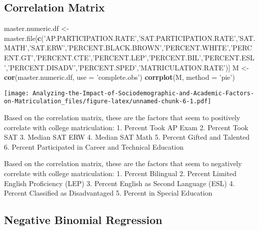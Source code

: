 \documentclass[
]{article}
\newenvironment{Shaded}{\begin{snugshade}}{\end{snugshade}}
\newcommand{\DataTypeTok}[1]{\textcolor[rgb]{0.13,0.29,0.53}{#1}}
\newcommand{\KeywordTok}[1]{\textcolor[rgb]{0.13,0.29,0.53}{\textbf{#1}}}
\newcommand{\NormalTok}[1]{#1}
\newcommand{\StringTok}[1]{\textcolor[rgb]{0.31,0.60,0.02}{#1}}
\begin{document}
\hypertarget{correlation-matrix}{%
\subsection{Correlation Matrix}\label{correlation-matrix}}

\begin{Shaded}
\begin{Highlighting}[]
\NormalTok{master.numeric.df <-}\StringTok{ }\NormalTok{master.file[}\KeywordTok{c}\NormalTok{(}\StringTok{'AP.PARTICIPATION.RATE'}\NormalTok{,}\StringTok{'SAT.PARTICIPATION.RATE'}\NormalTok{,}\StringTok{'SAT.MATH'}\NormalTok{,}\StringTok{'SAT.ERW'}\NormalTok{,}\StringTok{'PERCENT.BLACK.BROWN'}\NormalTok{,}\StringTok{'PERCENT.WHITE'}\NormalTok{,}\StringTok{'PERCENT.GT'}\NormalTok{,}\StringTok{'PERCENT.CTE'}\NormalTok{,}\StringTok{'PERCENT.LEP'}\NormalTok{,}\StringTok{'PERCENT.BIL'}\NormalTok{,}\StringTok{'PERCENT.ESL'}\NormalTok{,}\StringTok{'PERCENT.DISADV'}\NormalTok{,}\StringTok{'PERCENT.SPED'}\NormalTok{,}\StringTok{'MATRICULATION.RATE'}\NormalTok{)]}
\NormalTok{M <-}\StringTok{ }\KeywordTok{cor}\NormalTok{(master.numeric.df, }\DataTypeTok{use =} \StringTok{'complete.obs'}\NormalTok{)}
\KeywordTok{corrplot}\NormalTok{(M, }\DataTypeTok{method =} \StringTok{'pie'}\NormalTok{)}
\end{Highlighting}
\end{Shaded}

\texttt{[image: Analyzing-the-Impact-of-Sociodemographic-and-Academic-Factors-on-Matriculation\_files/figure-latex/unnamed-chunk-6-1.pdf]}

Based on the correlation matrix, these are the factors that seem to
positively correlate with college matriculation: 1. Percent Took AP Exam
2. Percent Took SAT 3. Median SAT ERW 4. Median SAT Math 5. Percent
Gifted and Talented 6. Percent Participated in Career and Technical
Education

Based on the correlation matrix, these are the factors that seem to
negatively correlate with college matriculation: 1. Percent Bilingual 2.
Percent Limited English Proficiency (LEP) 3. Percent English as Second
Language (ESL) 4. Percent Classified as Disadvantaged 5. Percent in
Special Education

\hypertarget{negative-binomial-regression}{%
\subsection{Negative Binomial
Regression}\label{negative-binomial-regression}}
\end{document}
